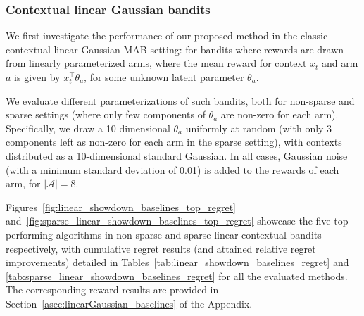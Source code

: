 \subsubsection{Contextual linear Gaussian bandits}
\label{sssec:evaluation_contextual_linear_baselines}

We first investigate the performance of our proposed method in the classic contextual linear Gaussian MAB setting: \ie for bandits where rewards are drawn from linearly parameterized arms, where the mean reward for context $x_t$ and arm $a$ is given by $x_t^\top \theta_a$, for some unknown latent parameter $\theta_a$.

We evaluate different parameterizations of such bandits, both for non-sparse and sparse settings (where only few components of $\theta_a$ are non-zero for each arm).
Specifically, we draw a 10 dimensional $\theta_a$ uniformly at random (with only 3 components left as non-zero for each arm in the sparse setting), with contexts distributed as a 10-dimensional standard Gaussian. In all cases, Gaussian noise (with a minimum standard deviation of 0.01) is added to the rewards of each arm, for $|\mathcal{A}|=8$.

Figures~\ref{fig:linear_showdown_baselines_top_regret} and~\ref{fig:sparse_linear_showdown_baselines_top_regret} showcase the five top performing algorithms in non-sparse and sparse linear contextual bandits respectively, with cumulative regret results (and attained relative regret improvements) detailed in Tables~\ref{tab:linear_showdown_baselines_regret} and \ref{tab:sparse_linear_showdown_baselines_regret} for all the evaluated methods.
The corresponding reward results are provided in Section~\ref{asec:linearGaussian_baselines} of the Appendix.

